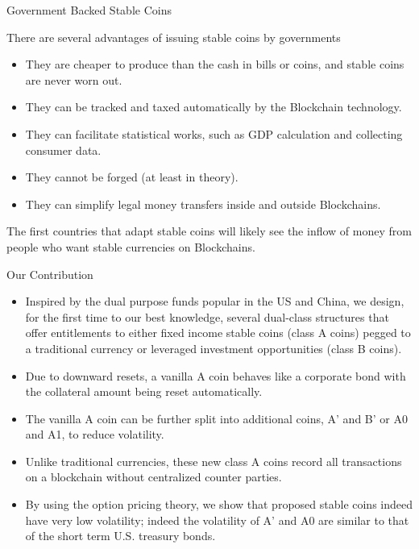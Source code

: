 \documentclass[notes=show, beamer, handout]{beamer}
\begin{document}
\begin{frame}{Government Backed Stable Coins}





There are several advantages of issuing stable coins by governments
\begin{itemize}
\item They are cheaper to produce than the cash in bills or coins, and stable coins are never worn out.
\item They can be tracked and taxed automatically by the Blockchain technology.
\item They can facilitate statistical works, such as GDP calculation and collecting consumer data.
\item They cannot be forged (at least in theory).
\item They can simplify legal money transfers inside and outside Blockchains.
\end{itemize}

The first countries that adapt stable coins will likely see the inflow of money from people who want stable currencies on Blockchains.
\end{frame}



\begin{frame}{Our Contribution}
\begin{itemize}
\item Inspired by the dual purpose funds popular in the US and China,
we design, for the first time to our best knowledge, several dual-class structures that
offer entitlements to either fixed income stable coins (class A coins) pegged to a
traditional currency or leveraged investment opportunities (class B coins).
 \pause
\item Due to downward resets, a vanilla A coin behaves like a corporate bond with the collateral amount being reset automatically.
 \pause
\item The vanilla A coin can be further split into additional coins, A' and B' or A0 and A1, to reduce volatility.
 \pause
\item Unlike traditional currencies, these new class A coins record all transactions on a blockchain
without centralized counter parties.
 \pause
\item By using the option pricing theory, we show that
proposed stable coins indeed have very low volatility; indeed the volatility of  A' and A0 are similar to that of the short
term U.S. treasury bonds.
\end{itemize}
\end{frame}
\end{document}
